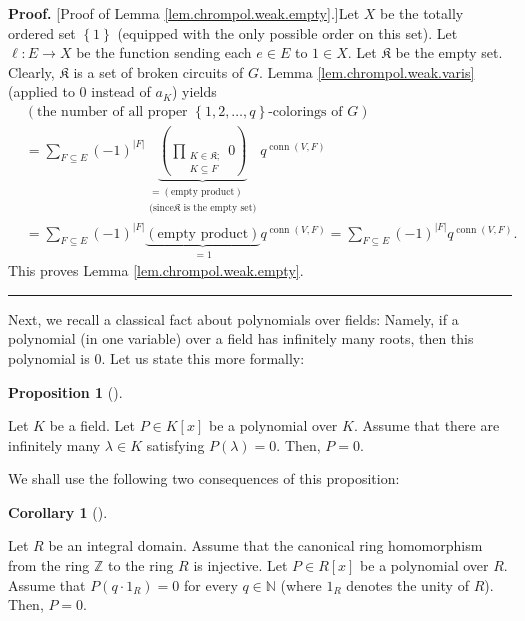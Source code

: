 \documentclass[numbers=enddot,12pt,final,onecolumn,notitlepage]{scrartcl}%
\theoremstyle{definition}
\newtheorem{prop}[theo]{Proposition}
\newenvironment{proposition}[1][]
{\begin{prop}[#1]\begin{leftbar}}
{\end{leftbar}\end{prop}}
\newtheorem{coro}[theo]{Corollary}
\newenvironment{corollary}[1][]
{\begin{coro}[#1]\begin{leftbar}}
{\end{leftbar}\end{coro}}
\newenvironment{proof}[1][Proof]{\noindent\textbf{#1.} }{\ \rule{0.5em}{0.5em}}
\newenvironment{verlong}{}{}
\let\sumnonlimits\sum
\let\prodnonlimits\prod
\renewcommand{\sum}{\sumnonlimits\limits}
\renewcommand{\prod}{\prodnonlimits\limits}
\begin{document}
\begin{verlong}
\begin{proof}
[Proof of Lemma \ref{lem.chrompol.weak.empty}.]Let $X$ be the totally ordered
set $\left\{  1\right\}  $ (equipped with the only possible order on this
set). Let $\ell:E\rightarrow X$ be the function sending each $e\in E$ to $1\in
X$. Let $\mathfrak{K}$ be the empty set. Clearly, $\mathfrak{K}$ is a set of
broken circuits of $G$. Lemma \ref{lem.chrompol.weak.varis} (applied to $0$
instead of $a_{K}$) yields%
\begin{align*}
&  \left(  \text{the number of all proper }\left\{  1,2,\ldots,q\right\}
\text{-colorings of }G\right) \\
&  =\sum_{F\subseteq E}\left(  -1\right)  ^{\left\vert F\right\vert
}\underbrace{\left(  \prod_{\substack{K\in\mathfrak{K};\\K\subseteq
F}}0\right)  }_{\substack{=\left(  \text{empty product}\right)  \\\text{(since
}\mathfrak{K}\text{ is the empty set)}}}q^{\operatorname*{conn}\left(
V,F\right)  }\\
&  =\sum_{F\subseteq E}\left(  -1\right)  ^{\left\vert F\right\vert
}\underbrace{\left(  \text{empty product}\right)  }_{=1}%
q^{\operatorname*{conn}\left(  V,F\right)  }=\sum_{F\subseteq E}\left(
-1\right)  ^{\left\vert F\right\vert }q^{\operatorname*{conn}\left(
V,F\right)  }.
\end{align*}
This proves Lemma \ref{lem.chrompol.weak.empty}.
\end{proof}
\end{verlong}

Next, we recall a classical fact about polynomials over fields: Namely, if a
polynomial (in one variable) over a field has infinitely many roots, then this
polynomial is $0$. Let us state this more formally:

\begin{proposition}
\label{prop.poly0.field}Let $K$ be a field. Let $P\in K\left[  x\right]  $ be
a polynomial over $K$. Assume that there are infinitely many $\lambda\in K$
satisfying $P\left(  \lambda\right)  =0$. Then, $P=0$.
\end{proposition}

We shall use the following two consequences of this proposition:

\begin{corollary}
\label{cor.poly0.intdom}Let $R$ be an integral domain. Assume that the
canonical ring homomorphism from the ring $\mathbb{Z}$ to the ring $R$ is
injective. Let $P\in R\left[  x\right]  $ be a polynomial over $R$. Assume
that $P\left(  q\cdot1_{R}\right)  =0$ for every $q\in\mathbb{N}$ (where
$1_{R}$ denotes the unity of $R$). Then, $P=0$.
\end{corollary}
\end{document}

